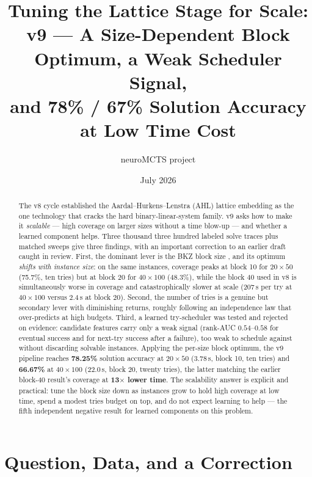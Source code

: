 \documentclass[12pt]{article}
\title{Tuning the Lattice Stage for Scale:\\
v9 --- A Size-Dependent Block Optimum, a Weak Scheduler Signal,\\
and 78\% / 67\% Solution Accuracy at Low Time Cost}
\author{neuroMCTS project}
\date{July 2026}
\begin{document}
\maketitle

\begin{abstract}
The v8 cycle established the Aardal--Hurkens--Lenstra (AHL) lattice embedding \citep{aardal2000diophantine, aardal2000market} as the one technology that cracks the hard binary-linear-system family. v9 asks how to make it \emph{scalable} --- high coverage on larger sizes without a time blow-up --- and whether a learned component helps. Three thousand three hundred labeled solve traces plus matched sweeps give three findings, with an important correction to an earlier draft caught in review. First, the dominant lever is the BKZ block size \citep{schnorr1994lattice}, and its optimum \emph{shifts with instance size}: on the same instances, coverage peaks at block 10 for $20 \times 50$ (75.7\%, ten tries) but at block 20 for $40 \times 100$ (48.3\%), while the block 40 used in v8 is simultaneously worse in coverage and catastrophically slower at scale (207\,s per try at $40 \times 100$ versus 2.4\,s at block 20). Second, the number of tries is a genuine but secondary lever with diminishing returns, roughly following an independence law that over-predicts at high budgets. Third, a learned try-scheduler was tested and rejected on evidence: candidate features carry only a weak signal (rank-AUC $0.54$--$0.58$ for eventual success and for next-try success after a failure), too weak to schedule against without discarding solvable instances. Applying the per-size block optimum, the v9 pipeline reaches \textbf{78.25\%} solution accuracy at $20 \times 50$ (3.78\,s, block 10, ten tries) and \textbf{66.67\%} at $40 \times 100$ (22.0\,s, block 20, twenty tries), the latter matching the earlier block-40 result's coverage at \textbf{13$\times$ lower time}. The scalability answer is explicit and practical: tune the block size down as instances grow to hold high coverage at low time, spend a modest tries budget on top, and do not expect learning to help --- the fifth independent negative result for learned components on this problem.
\end{abstract}

\section{Question, Data, and a Correction}
\end{document}
